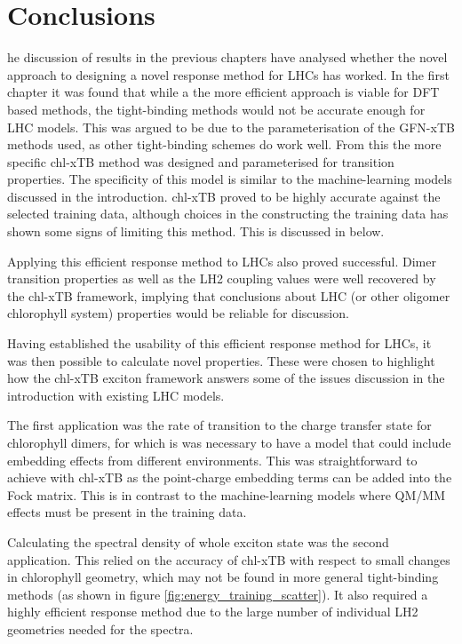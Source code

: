 %
%
\let\textcircled=\pgftextcircled
\chapter{Conclusions}
\label{chap:discussion}

he discussion of results in the previous chapters have analysed whether
the novel approach to designing a novel response method for LHCs has worked. In 
the first chapter it was found that while a the more efficient \dscf approach is 
viable for DFT based methods, the tight-binding \dxtb methods would not be accurate
enough for LHC models. This was argued to be due to the parameterisation of the 
GFN-xTB methods used, as other tight-binding schemes do work well. From this the
more specific chl-xTB method was designed and parameterised for \Qy transition properties.
The specificity of this model is similar to the machine-learning models discussed 
in the introduction. chl-xTB proved to be highly accurate against the selected training
data, although choices in the constructing the training data has shown some signs
of limiting this method. This is discussed in below. 

Applying this efficient response method to LHCs also proved successful. Dimer transition 
properties as well as the LH2 coupling values were well recovered by the chl-xTB 
framework, implying that conclusions about LHC (or other oligomer chlorophyll system) 
properties would be reliable for discussion. 

Having established the usability of this efficient response method for LHCs, it
was then possible to calculate novel properties. These were chosen to highlight 
how the chl-xTB exciton framework answers some of the issues discussion in the introduction
with existing LHC models. 

The first application was the rate of transition to the charge transfer state for
chlorophyll dimers, for which is was necessary to have a model that could include 
embedding effects from different environments. This was straightforward to achieve 
with chl-xTB as the point-charge embedding terms can be added into the Fock matrix. 
This is in contrast to the machine-learning models where QM/MM effects must be present 
in the training data. 

Calculating the spectral density of whole exciton state was the second application.
This relied on the accuracy of chl-xTB with respect to small changes in chlorophyll
geometry, which may not be found in more general tight-binding methods (as shown
in figure \ref{fig:energy_training_scatter}). It also required a highly efficient
response method due to the large number of individual LH2 geometries needed for 
the spectra.

